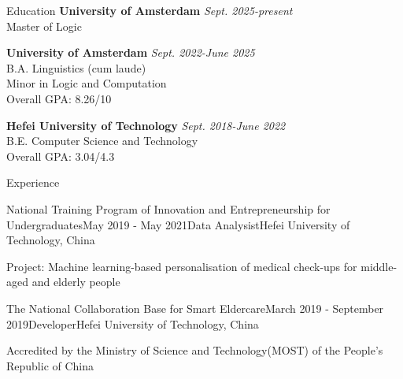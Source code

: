 \documentclass[
	11pt, %
]{resume} %
\begin{document}

\begin{rSection}{Education}
	\textbf{University of Amsterdam} \hfill \textit{Sept. 2025-present} \\ 
	Master of Logic

	
	\textbf{University of Amsterdam} \hfill \textit{Sept. 2022-June 2025} \\ 
	B.A.  Linguistics (cum laude) \\
	Minor in Logic and Computation \smallskip \\
	Overall GPA: 8.26/10
	
    \textbf{Hefei University of Technology} \hfill \textit{Sept. 2018-June 2022} \\ 
	B.E.  Computer Science and Technology\\
	Overall GPA: 3.04/4.3

\end{rSection}


\begin{rSection}{Experience}
	\begin{rSubsection}{National Training Program of Innovation and Entrepreneurship for Undergraduates}{May 2019 - May 2021}{Data Analysist}{Hefei University of Technology, China}
		\item Project: Machine learning-based personalisation of medical check-ups for middle-aged and elderly people
	\end{rSubsection}

	\begin{rSubsection}{The National Collaboration Base for Smart Eldercare}{March 2019 - September 2019}{Developer}{Hefei University of Technology, China}
		\item Accredited by the Ministry of Science and Technology(MOST) of the People's Republic of China
	\end{rSubsection}
\end{rSection}
\end{document}
